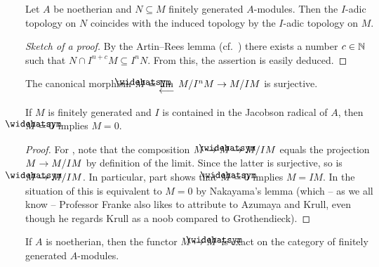\documentclass[a4paper,parskip=half,numbers=enddot, DIV=12]{scrreprt}
\begin{document}
\begin{prop}
	Let $A$ be noetherian and $N\subseteq M$ finitely generated $A$-modules. Then the $I$-adic topology on $N$ coincides with the induced topology by the $I$-adic topology on $M$.
\end{prop}
\begin{proof}[Sketch of a proof]
	By the Artin--Rees lemma (cf.\ \cite[Proposition~3.4.1]{alg2}) there exists a number $c\in\mathbb{N}$ such that $N\cap I^{n+c}M\subseteq I^nN$. From this, the assertion is easily deduced.
\end{proof}
\begin{fact}
	\begin{alphanumerate}
		\item {}The canonical morphism $\roof{M}=\limit M/I^nM\morphism M/IM$ is surjective.
		\item If $M$ is finitely generated and $I$ is contained in the Jacobson radical of $A$, then $\roof{M}=0$ implies $M=0$.
	\end{alphanumerate}
\end{fact}
\begin{proof}
	For , note that the composition $M\morphism\roof{M}\morphism M/IM$ equals the projection $M\morphism M/IM$ by definition of the limit. Since the latter is surjective, so is $\roof{M}\morphism M/IM$. In particular, part  shows that $\roof{M}=0$ implies $M=IM$. In the situation of  this is equivalent to $M=0$ by Nakayama's lemma (which -- as we all know -- Professor Franke also likes to attribute to Azumaya and Krull, even though he regards Krull as a noob compared to Grothendieck).
\end{proof}
\begin{cor}
	If $A$ is noetherian, then the functor $M\mapsto \roof{M}$ is exact on the category of finitely generated $A$-modules.
\end{cor}
\end{document}
